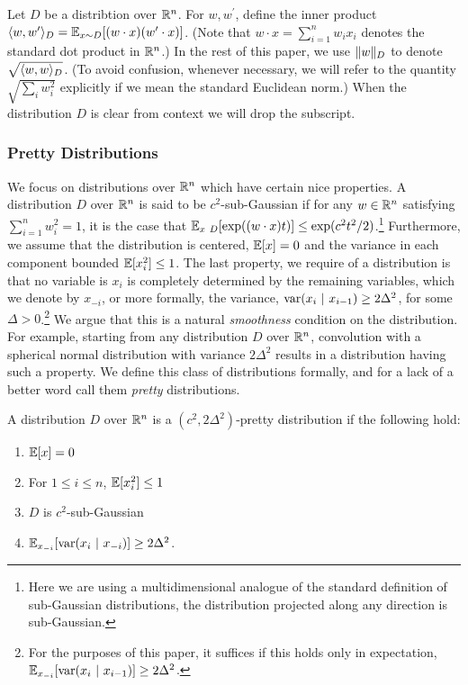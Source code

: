Let $D$ be a distribtion over $\mathbb{R}^n$. For $w, w^\prime$, define the inner
product $\langle w, w^\prime \rangle_D = \mathbb{E}_{x \sim D}[(w \cdot x) (w^\prime \cdot x)]$.
(Note that $w \cdot x = \sum_{i = 1}^n w_i x_i$ denotes the standard dot product
in $\mathbb{R}^n$.) In the rest of this paper, we use $\Vert w \Vert_D$ to denote
$\sqrt{\langle w, w \rangle_D}$. (To avoid confusion, whenever necessary, we
will refer to the quantity $\sqrt{\sum_{i} w_i^2}$ explicitly if we mean the standard
Euclidean norm.) When the distribution $D$ is clear from context we will drop
the subscript.



\subsubsection*{Pretty Distributions}

We focus on distributions over $\mathbb{R}^n$ which have certain nice properties. A
distribution $D$ over $\mathbb{R}^n$ is said to be $c^2$-sub-Gaussian if for any $w
\in \mathbb{R}^n$ satisfying $\sum_{i=1}^n w_i^2 = 1$, it is the case that
$\mathbb{E}_{x~D}[ \exp((w \cdot x)t)] \leq \exp(c^2 t^2 /2)$.\footnote{Here we are
using a multidimensional analogue of the standard definition of sub-Gaussian
distributions, \ie the distribution projected along any direction is
sub-Gaussian.} Furthermore, we assume that the distribution is centered, \ie
$\mathbb{E}[x] = 0$ and the variance in each component bounded $\mathbb{E}[x_i^2] \leq 1$. The
last property, we require of a distribution is that no variable is $x_i$ is
completely determined by the remaining variables, which we denote by $x_{-i}$,
or more formally, the variance, $\mathrm{var}(x_i ~|~ x_{i-1}) \geq 2 \Delta^2$, for
some $\Delta > 0$.\footnote{For the purposes of this paper, it suffices if this
holds only in expectation, \ie $\mathbb{E}_{x_{-i}}[\mathrm{var}(x_i ~|~ x_{i-1})] \geq 2
\Delta^2$.} We argue that this is a natural \emph{smoothness} condition on the
distribution. For example, starting from any distribution $D$ over $\mathbb{R}^n$,
convolution with a spherical normal distribution with variance $2 \Delta^2$
results in a distribution having such a property. We define this class of
distributions formally, and for a lack of a better word call them \emph{pretty}
distributions.

\begin{definition} A distribution $D$ over $\mathbb{R}^n$ is a $(c^2,
2\Delta^2)$-pretty distribution if the following hold:
\begin{enumerate}
\item $\mathbb{E}[x] = 0$
\item For $1 \leq i \leq n$, $\mathbb{E}[x_i^2] \leq 1$
\item $D$ is $c^2$-sub-Gaussian
\item $\mathbb{E}_{x_{-i}}[\mathrm{var}(x_i ~|~ x_{-i})] \geq 2\Delta^2$.
\end{enumerate}
\end{definition}

